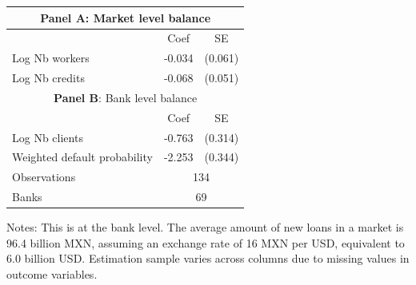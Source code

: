 \centering
\begin{threeparttable}
\begin{tabular}{lcc}
\toprule
\multicolumn{3}{c}{\textbf{Panel A}: Market level balance} \\
\midrule
 & Coef & SE \\
\midrule
Log Nb workers & -0.034  & (0.061)  \\
Log Nb credits & -0.068  & (0.051)  \\
\midrule
\multicolumn{3}{c}{\textbf{Panel B}: Bank level balance} \\
\midrule
 & Coef & SE \\
\midrule
Log Nb clients & -0.763  & (0.314)  \\
Weighted default probability & -2.253  & (0.344)  \\
\midrule
Observations & \multicolumn{2}{c}{134} \\
Banks & \multicolumn{2}{c}{69} \\
\bottomrule
\end{tabular}
\begin{tablenotes}[flushleft]
\tiny
\item Notes: This is at the bank level. The average amount of new loans in a market is 96.4 billion MXN, assuming an exchange rate of 16 MXN per USD, equivalent to 6.0 billion USD. Estimation sample varies across columns due to missing values in outcome variables.
\end{tablenotes}
\end{threeparttable}